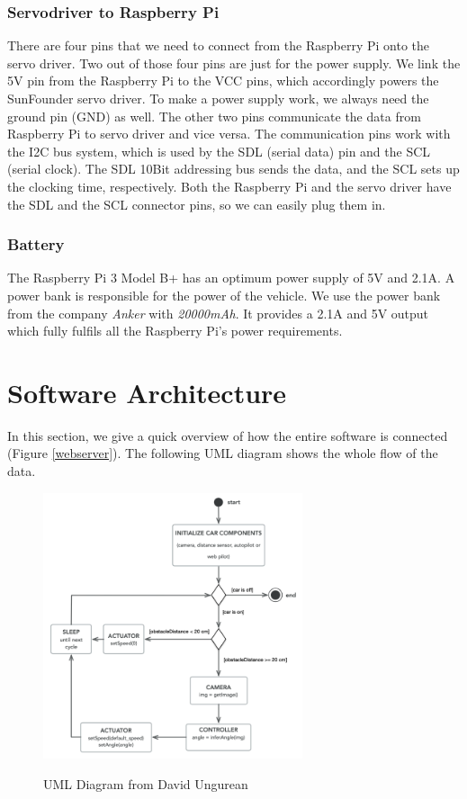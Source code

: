 \documentclass[journal]{IEEEtran}
\begin{document}
\subsubsection{Servodriver to Raspberry Pi}
There are four pins that we need to connect from the Raspberry Pi onto the servo driver. Two out of those four pins are just for the power supply. We link the 5V pin from the Raspberry Pi to the VCC pins, which accordingly powers the SunFounder servo driver. To make a power supply work, we always need the ground pin (GND) as well. The other two pins communicate the data from Raspberry Pi to servo driver and vice versa. The communication pins work with the I2C bus system, which is used by the SDL (serial data) pin and the SCL (serial clock). The SDL 10Bit addressing bus sends the data, and the SCL sets up the clocking time, respectively. Both the Raspberry Pi and the servo driver have the SDL and the SCL connector pins, so we can easily plug them in. 
\subsubsection{Battery}
The Raspberry Pi 3 Model B+ has an optimum power supply of 5V and 2.1A.  A power bank is responsible for the power of the vehicle.  We use the power bank from the company \textit{Anker} with \textit{20000mAh}. It provides a 2.1A and 5V output which fully fulfils all the Raspberry Pi's power requirements. \\
\section{Software Architecture}

In this section, we give a quick overview of how the entire software is connected (Figure \ref{webserver}). The following UML diagram shows the whole flow of the data.

\begin{figure}
  \begin{center}
  \includegraphics[width=3in]{photo/uml}\\
  \caption{UML Diagram from David Ungurean \cite{master}}\label{uml}
  \end{center}
\end{figure}
\end{document}
